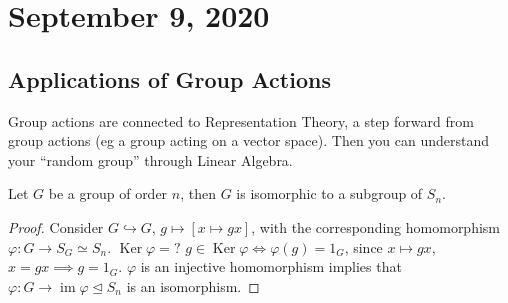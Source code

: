 \section{September 9, 2020}
\subsection{Applications of Group Actions}
Group actions are connected to Representation Theory, a step forward from group actions (eg a group acting on a vector space). Then you can understand your ``random group'' through Linear Algebra.
\begin{prop}
    Let $G$ be a group of order $n$, then $G$ is isomorphic to a subgroup of $S_n$.
\end{prop}
\begin{proof}
    Consider $G \hookrightarrow G$, $g \mapsto [x \mapsto gx]$, with the corresponding homomorphism $\varphi \colon G \to S_G \simeq S_n$. $\operatorname{Ker}\varphi=?$ $g\in \operatorname{Ker}\varphi \iff \varphi(g)=1_G$, since $x\mapsto gx$, $x=gx \implies g=1_G$. $\varphi$ is an injective homomorphism implies that $\varphi \colon G \to \operatorname{im}\varphi \trianglelefteq S_n$ is an isomorphism.
\end{proof}

